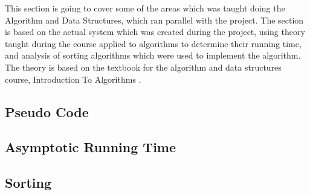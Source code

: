 This section is going to cover some of the areas which was taught doing the Algorithm and Data Structures, which ran parallel with the project. The section is based on the actual system which was created during the project, using theory taught during the course applied to algorithms to determine their running time, and analysis of sorting algorithms which were used to implement the algorithm. The theory is based on the textbook for the algorithm and data structures course, Introduction To Algorithms \cite{IntroToAlgorithms}.

\subsection{Pseudo Code}
\label{PesudoCode}

\subsection{Asymptotic Running Time}
\label{AsymptoticTime}

\subsection{Sorting}
\label{Sorting}
